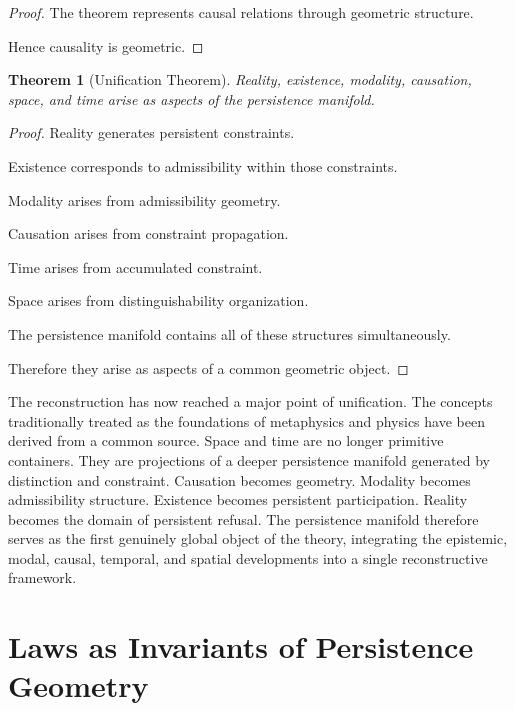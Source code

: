 \documentclass[12pt,oneside]{article}
\newtheorem{theorem}{Theorem}[section] \newtheorem{lemma}[theorem]{Lemma} \newtheorem{proposition}[theorem]{Proposition} \newtheorem{corollary}[theorem]{Corollary}
\theoremstyle{definition}
\begin{document}
\begin{proof}

The theorem represents causal relations through geometric structure.

Hence causality is geometric.

\end{proof}

\begin{theorem}[Unification Theorem]

Reality, existence, modality, causation, space, and time arise as aspects of the persistence manifold.

\end{theorem}

\begin{proof}

Reality generates persistent constraints.

Existence corresponds to admissibility within those constraints.

Modality arises from admissibility geometry.

Causation arises from constraint propagation.

Time arises from accumulated constraint.

Space arises from distinguishability organization.

The persistence manifold contains all of these structures simultaneously.

Therefore they arise as aspects of a common geometric object.

\end{proof}

The reconstruction has now reached a major point of unification. The concepts traditionally treated as the foundations of metaphysics and physics have been derived from a common source. Space and time are no longer primitive containers. They are projections of a deeper persistence manifold generated by distinction and constraint. Causation becomes geometry. Modality becomes admissibility structure. Existence becomes persistent participation. Reality becomes the domain of persistent refusal. The persistence manifold therefore serves as the first genuinely global object of the theory, integrating the epistemic, modal, causal, temporal, and spatial developments into a single reconstructive framework.

\section{Laws as Invariants of Persistence Geometry}
\end{document}

